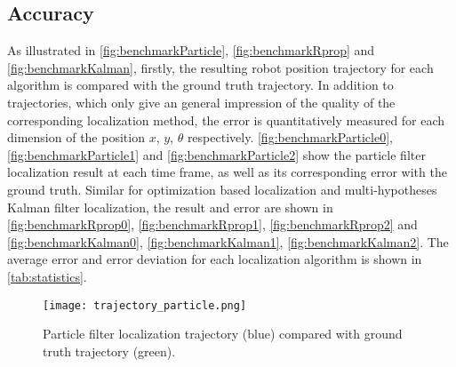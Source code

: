\subsection{Accuracy}
\label{sub:Accuracy}
As illustrated in \autoref{fig:benchmarkParticle}, \autoref{fig:benchmarkRprop} and \autoref{fig:benchmarkKalman}, firstly, the resulting robot position trajectory for each algorithm is compared with the ground truth trajectory. In addition to trajectories, which only give an general impression of the quality of the corresponding localization method, the error is quantitatively measured for each dimension of the position $x$, $y$, $\theta$ respectively. 
\autoref{fig:benchmarkParticle0},  \autoref{fig:benchmarkParticle1} and \autoref{fig:benchmarkParticle2} show the particle filter localization result at each time frame, as well as its corresponding error with the ground truth. Similar for optimization based localization and multi-hypotheses Kalman filter localization,  the result and error are shown in \autoref{fig:benchmarkRprop0},  \autoref{fig:benchmarkRprop1}, \autoref{fig:benchmarkRprop2} and \autoref{fig:benchmarkKalman0},  \autoref{fig:benchmarkKalman1}, \autoref{fig:benchmarkKalman2}. The average error and error deviation for each localization algorithm is shown in \autoref{tab:statistics}.




% 

\begin{figure}[!htbp]
\begin{center}
 	\texttt{[image: trajectory\_particle.png]}
\end{center}
\caption[Particle filter localization trajectory compared with ground truth trajectory.]{Particle filter localization trajectory (blue) compared with ground truth trajectory (green).}
\label{fig:benchmarkParticle}
\end{figure}


